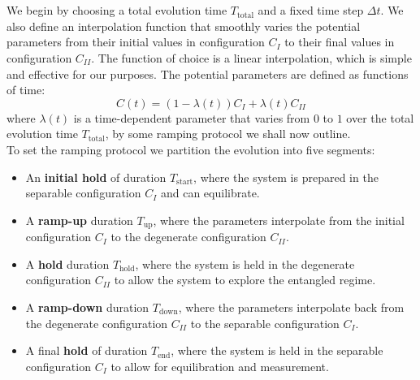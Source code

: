 \documentclass{subfiles}
\begin{document}
\\\\ We begin by choosing a total evolution time $T_\text{total}$ and a fixed time step $\Delta t$. We also define an interpolation function that smoothly varies the potential parameters from their initial values in configuration $C_I$ to their final values in configuration $C_{II}$. The function of choice is a linear interpolation, which is simple and effective for our purposes. The potential parameters are defined as functions of time:
\begin{equation}
    C(t) = (1 - \lambda(t))C_I + \lambda(t)C_{II}\label{eq:interpolation_function}
\end{equation}
where $\lambda(t)$ is a time-dependent parameter that varies from $0$ to $1$ over the total evolution time $T_\text{total}$, by some ramping protocol we shall now outline.\\

To set the ramping protocol we partition the evolution into five segments:
\begin{itemize}
    \item An \textbf{initial hold} of duration $T_{\text{start}}$, where the system is prepared in the separable configuration $C_I$ and can equilibrate.
    \item A \textbf{ramp-up} duration $T_{\text{up}}$, where the parameters interpolate from the initial configuration $C_I$ to the degenerate configuration $C_{II}$.
    \item A \textbf{hold} duration $T_{\text{hold}}$, where the system is held in the degenerate configuration $C_{II}$ to allow the system to explore the entangled regime.
    \item A \textbf{ramp-down} duration $T_{\text{down}}$, where the parameters interpolate back from the degenerate configuration $C_{II}$ to the separable configuration $C_I$.
    \item A final \textbf{hold} of duration $T_{\text{end}}$, where the system is held in the separable configuration $C_I$ to allow for equilibration and measurement.
\end{itemize}
\end{document}
